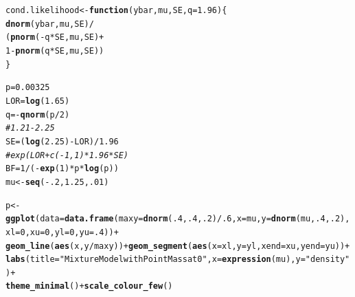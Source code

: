 \documentclass[AMA,STIX1COL]{WileyNJD-v2}\usepackage[]{graphicx}\usepackage[]{color}
\makeatletter
\newcommand{\hlnum}[1]{\textcolor[rgb]{0.686,0.059,0.569}{#1}}%
\newcommand{\hlstr}[1]{\textcolor[rgb]{0.192,0.494,0.8}{#1}}%
\newcommand{\hlcom}[1]{\textcolor[rgb]{0.678,0.584,0.686}{\textit{#1}}}%
\newcommand{\hlopt}[1]{\textcolor[rgb]{0,0,0}{#1}}%
\newcommand{\hlstd}[1]{\textcolor[rgb]{0.345,0.345,0.345}{#1}}%
\newcommand{\hlkwa}[1]{\textcolor[rgb]{0.161,0.373,0.58}{\textbf{#1}}}%
\newcommand{\hlkwb}[1]{\textcolor[rgb]{0.69,0.353,0.396}{#1}}%
\newcommand{\hlkwc}[1]{\textcolor[rgb]{0.333,0.667,0.333}{#1}}%
\newcommand{\hlkwd}[1]{\textcolor[rgb]{0.737,0.353,0.396}{\textbf{#1}}}%
\newenvironment{kframe}{%
 \def\at@end@of@kframe{}%
 \ifinner\ifhmode%
  \def\at@end@of@kframe{\end{minipage}}%
  \begin{minipage}{\columnwidth}%
 \fi\fi%
 \def\FrameCommand##1{\hskip\@totalleftmargin \hskip-\fboxsep
 \colorbox{shadecolor}{##1}\hskip-\fboxsep
     \hskip-\linewidth \hskip-\@totalleftmargin \hskip\columnwidth}%
 \MakeFramed {\advance\hsize-\width
   \@totalleftmargin\z@ \linewidth\hsize
   \@setminipage}}%
 {\par\unskip\endMakeFramed%
 \at@end@of@kframe}
\newenvironment{knitrout}{}{} %
\makeatother
\begin{document}
\begin{knitrout}
\color{fgcolor}\begin{kframe}
\begin{alltt}
\hlstd{cond.likelihood}\hlkwb{<-} \hlkwa{function}\hlstd{(}\hlkwc{ybar}\hlstd{,} \hlkwc{mu}\hlstd{,} \hlkwc{SE}\hlstd{,} \hlkwc{q}\hlstd{=}\hlnum{1.96}\hlstd{)\{}
  \hlkwd{dnorm}\hlstd{(ybar, mu, SE)}\hlopt{/}
    \hlstd{(}\hlkwd{pnorm}\hlstd{(}\hlopt{-}\hlstd{q}\hlopt{*}\hlstd{SE, mu, SE)} \hlopt{+}
       \hlnum{1}\hlopt{-}\hlkwd{pnorm}\hlstd{(q}\hlopt{*}\hlstd{SE, mu, SE))}
\hlstd{\}}

\hlstd{p} \hlkwb{=} \hlnum{0.00325}
\hlstd{LOR} \hlkwb{=} \hlkwd{log}\hlstd{(}\hlnum{1.65}\hlstd{)}
\hlstd{q} \hlkwb{=} \hlopt{-}\hlkwd{qnorm}\hlstd{(p}\hlopt{/}\hlnum{2}\hlstd{)}
\hlcom{# 1.21-2.25}
\hlstd{SE} \hlkwb{=}  \hlstd{(}\hlkwd{log}\hlstd{(}\hlnum{2.25} \hlstd{)} \hlopt{-} \hlstd{LOR)}\hlopt{/}\hlnum{1.96}
\hlcom{#exp(LOR + c(-1, 1)*1.96*SE)}
\hlstd{BF} \hlkwb{=} \hlnum{1}\hlopt{/}\hlstd{(}\hlopt{-}\hlkwd{exp}\hlstd{(}\hlnum{1}\hlstd{)}\hlopt{*}\hlstd{p}\hlopt{*}\hlkwd{log}\hlstd{(p))}
\hlstd{mu} \hlkwb{<-} \hlkwd{seq}\hlstd{(}\hlopt{-}\hlnum{.2}\hlstd{,}\hlnum{1.25}\hlstd{,}\hlnum{.01}\hlstd{)}

\hlstd{p}\hlkwb{<-}\hlkwd{ggplot}\hlstd{(}\hlkwc{data} \hlstd{=} \hlkwd{data.frame}\hlstd{(}\hlkwc{maxy} \hlstd{=} \hlkwd{dnorm}\hlstd{(}\hlnum{.4}\hlstd{,} \hlnum{.4}\hlstd{,}\hlnum{.2}\hlstd{)}\hlopt{/}\hlnum{.6}\hlstd{,} \hlkwc{x} \hlstd{= mu,} \hlkwc{y} \hlstd{=} \hlkwd{dnorm}\hlstd{(mu,} \hlnum{.4}\hlstd{,}\hlnum{.2}\hlstd{),} \hlkwc{xl}\hlstd{=}\hlnum{0}\hlstd{,} \hlkwc{xu}\hlstd{=}\hlnum{0}\hlstd{,}\hlkwc{yl}\hlstd{=}\hlnum{0}\hlstd{,}\hlkwc{yu}\hlstd{=}\hlnum{.4}\hlstd{))}\hlopt{+}
  \hlkwd{geom_line}\hlstd{(}\hlkwd{aes}\hlstd{(x,y}\hlopt{/}\hlstd{maxy))}\hlopt{+}\hlkwd{geom_segment}\hlstd{(}\hlkwd{aes}\hlstd{(}\hlkwc{x}\hlstd{=xl,}\hlkwc{y}\hlstd{=yl,}\hlkwc{xend}\hlstd{=xu,}\hlkwc{yend}\hlstd{=yu))}\hlopt{+}
  \hlkwd{labs}\hlstd{(}\hlkwc{title}\hlstd{=} \hlstr{"Mixture Model with Point Mass at 0"}\hlstd{,}\hlkwc{x}\hlstd{=}\hlkwd{expression}\hlstd{(mu),}\hlkwc{y}\hlstd{=}\hlstr{"density"}\hlstd{)}\hlopt{+}
  \hlkwd{theme_minimal}\hlstd{()} \hlopt{+} \hlkwd{scale_colour_few}\hlstd{()}
\end{alltt}
\end{kframe}
\end{knitrout}
\end{document}
